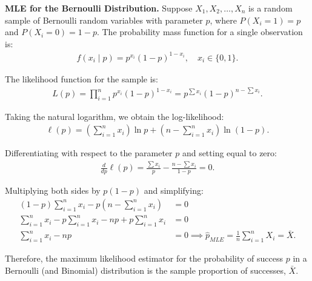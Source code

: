 \begin{ejemplo}
	\textbf{MLE for the Bernoulli Distribution.}
	Suppose $X_1, X_2, \ldots, X_n$ is a random sample of Bernoulli random variables with parameter $p$, where $P(X_i = 1) = p$ and $P(X_i = 0) = 1-p$. The probability mass function for a single observation is:
	\begin{align}
		f(x_i \mid p) = p^{x_i}(1-p)^{1-x_i}, \quad x_i \in \{0, 1\}.
	\end{align}

	The likelihood function for the sample is:
	\begin{align}
		L(p) = \prod_{i=1}^n p^{x_i}(1-p)^{1-x_i} = p^{\sum x_i}(1-p)^{n - \sum x_i}.
	\end{align}

	Taking the natural logarithm, we obtain the log-likelihood:
	\begin{align}
		\ell(p) = \left(\sum_{i=1}^n x_i\right) \ln p + \left(n - \sum_{i=1}^n x_i\right) \ln(1-p).
	\end{align}

	Differentiating with respect to the parameter $p$ and setting equal to zero:
	\begin{align}
		\frac{d}{dp} \ell(p) = \frac{\sum x_i}{p} - \frac{n - \sum x_i}{1-p} = 0.
	\end{align}

	Multiplying both sides by $p(1-p)$ and simplifying:
	\begin{align}
		(1-p)\sum_{i=1}^n x_i - p\left(n - \sum_{i=1}^n x_i\right) &= 0 \\
		\sum_{i=1}^n x_i - p\sum_{i=1}^n x_i - np + p\sum_{i=1}^n x_i &= 0 \\
		\sum_{i=1}^n x_i - np &= 0 \implies \hat{p}_{MLE} = \frac{1}{n} \sum_{i=1}^n X_i = \bar{X}.
	\end{align}

	Therefore, the maximum likelihood estimator for the probability of success $p$ in a Bernoulli (and Binomial) distribution is the sample proportion of successes, $\bar{X}$.
\end{ejemplo}

